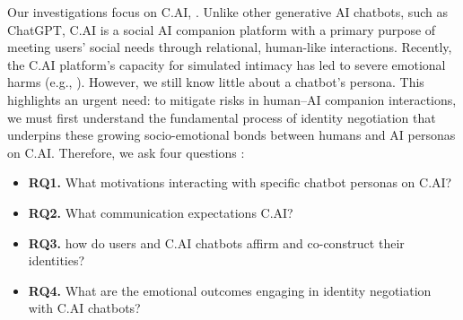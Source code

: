 \documentclass[sigconf, nonacm]{acmart}
\newcommand{\datamethodfinding}[1]{{\color{black}{#1}}}
\begin{document}
Our investigations focus on C.AI, \datamethodfinding{specifially the public discussions within the r/CharacterAI subreddit, a major online community for C.AI users}. Unlike other generative AI chatbots, such as ChatGPT, C.AI is a social AI companion platform with a primary purpose of meeting users' social needs through relational, human-like interactions. Recently, the C.AI platform's capacity for simulated intimacy has led to severe emotional harms (e.g., \cite{Roose2024, Jasnow2025}). However, we still know little about \datamethodfinding{how this community of C.AI users publicly discusses, frames, and makes sense of their engagement and identity construction alongside} a chatbot's persona. This highlights an urgent need: to mitigate risks in human–AI companion interactions, we must first understand the fundamental process of identity negotiation that underpins these growing socio-emotional bonds between humans and AI personas on C.AI. Therefore, we ask four questions \datamethodfinding{about the experiences and practices shared within this r/CharacterAI subreddit community}:

\begin{itemize}
    \item \textbf{RQ1.} What motivations \datamethodfinding{do the community members of r/CharacterAI subreddit report for} interacting with specific chatbot personas on C.AI?
    \item \textbf{RQ2.} What communication expectations \datamethodfinding{do they express regarding} C.AI?
    \item \textbf{RQ3.} \datamethodfinding{In such communication,} how do users and C.AI chatbots affirm and co-construct their identities?
    \item \textbf{RQ4.} What are the emotional outcomes \datamethodfinding{that users report} engaging in identity negotiation with C.AI chatbots?
\end{itemize}

    

    
\end{document}
